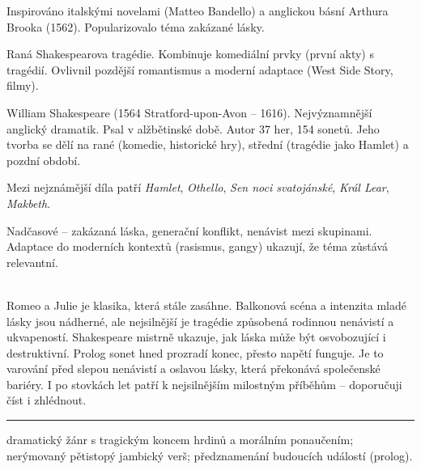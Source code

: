 \documentclass[FGBook.tex]{subfiles}
\begin{document}
\noindent Inspirováno italskými novelami (Matteo Bandello) a anglickou básní Arthura Brooka (1562). Popularizovalo téma zakázané lásky.

\noindent Raná Shakespearova tragédie. Kombinuje komediální prvky (první akty) s tragédií. Ovlivnil pozdější romantismus a moderní adaptace (West Side Story, filmy).

\noindent William Shakespeare (1564 Stratford-upon-Avon – 1616). Nejvýznamnější anglický dramatik. Psal v alžbětinské době. Autor 37 her, 154 sonetů. Jeho tvorba se dělí na rané (komedie, historické hry), střední (tragédie jako Hamlet) a pozdní období.

\noindent Mezi nejznámější díla patří \textit{Hamlet}, \textit{Othello}, \textit{Sen noci svatojánské}, \textit{Král Lear}, \textit{Makbeth}.

\noindent Nadčasové – zakázaná láska, generační konflikt, nenávist mezi skupinami. Adaptace do moderních kontextů (rasismus, gangy) ukazují, že téma zůstává relevantní.

\vspace*{2em}\\
\noindent Romeo a Julie je klasika, která stále zasáhne. Balkonová scéna a intenzita mladé lásky jsou nádherné, ale nejsilnější je tragédie způsobená rodinnou nenávistí a ukvapeností. Shakespeare mistrně ukazuje, jak láska může být osvobozující i destruktivní. Prolog sonet hned prozradí konec, přesto napětí funguje. Je to varování před slepou nenávistí a oslavou lásky, která překonává společenské bariéry. I po stovkách let patří k nejsilnějším milostným příběhům – doporučuji číst i zhlédnout.

\vfill

\noindent\begin{minipage}{\textwidth}
    {\textcolor{\wpagecolor}{\rule{\linewidth}{0.4pt}}
    \footnotesize
     dramatický žánr s tragickým koncem hrdinů a morálním ponaučením; 
     nerýmovaný pětistopý jambický verš; 
     předznamenání budoucích událostí (prolog).
    }
\end{minipage}

\newpage
\end{document}
